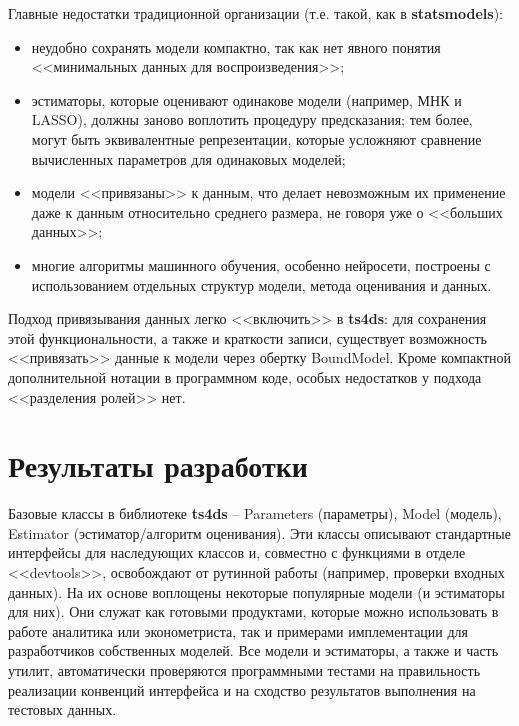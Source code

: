 \documentclass[a4paper,14pt]{extreport}
\begin{document}
	Главные недостатки традиционной организации (т.е. такой, как в \textbf{statsmodels}):
	
	\begin{itemize}
		\item неудобно сохранять модели компактно, так как нет явного понятия <<минимальных данных для воспроизведения>>;
		\item эстиматоры, которые оценивают одинакове модели (например, МНК и LASSO), должны заново воплотить процедуру предсказания; тем более, могут быть эквивалентные репрезентации, которые усложняют сравнение вычисленных параметров для одинаковых моделей;
		\item модели <<привязаны>> к данным, что делает невозможным их применение даже к данным относительно среднего размера, не говоря уже о <<больших данных>>;
		\item многие алгоритмы машинного обучения, особенно нейросети, построены с использованием отдельных структур модели, метода оценивания и данных.
	\end{itemize}
	
	Подход привязывания данных легко <<включить>> в \textbf{ts4ds}: для сохранения этой функциональности, а также и краткости записи, существует возможность <<привязать>> данные к модели через обертку BoundModel. Кроме компактной дополнительной нотации в программном коде, особых недостатков у подхода <<разделения ролей>> нет.
	
	\section{Результаты разработки}
	
	Базовые классы в библиотеке \textbf{ts4ds} -- Parameters (параметры), Model (модель), Estimator (эстиматор/алгоритм оценивания). Эти классы описывают стандартные интерфейсы для наследующих классов и, совместно с функциями в отделе <<devtools>>, освобождают от рутинной работы (например, проверки входных данных). На их основе воплощены некоторые популярные модели (и эстиматоры для них). Они служат как готовыми продуктами, которые можно использовать в работе аналитика или эконометриста, так и примерами имплементации для разработчиков собственных моделей. Все модели и эстиматоры, а также и часть утилит, автоматически проверяются программными тестами на правильность реализации конвенций интерфейса и на сходство результатов выполнения на тестовых данных.
	
	
\end{document}
